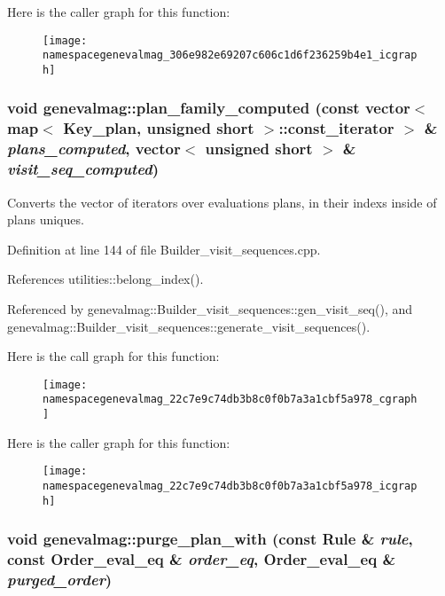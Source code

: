 Here is the caller graph for this function:\nopagebreak
\begin{figure}[H]
\begin{center}
\leavevmode
\texttt{[image: namespacegenevalmag\_306e982e69207c606c1d6f236259b4e1\_icgraph]}
\end{center}
\end{figure}
\hypertarget{namespacegenevalmag_22c7e9c74db3b8c0f0b7a3a1cbf5a978}{
\subsubsection[{plan\_\-family\_\-computed}]{\setlength{\rightskip}{0pt plus 5cm}void genevalmag::plan\_\-family\_\-computed (const vector$<$ map$<$ {\bf Key\_\-plan}, unsigned short $>$::const\_\-iterator $>$ \& {\em plans\_\-computed}, \/  vector$<$ unsigned short $>$ \& {\em visit\_\-seq\_\-computed})}}
\label{namespacegenevalmag_22c7e9c74db3b8c0f0b7a3a1cbf5a978}


Converts the vector of iterators over evaluations plans, in their indexs inside of plans uniques. 

Definition at line 144 of file Builder\_\-visit\_\-sequences.cpp.

References utilities::belong\_\-index().

Referenced by genevalmag::Builder\_\-visit\_\-sequences::gen\_\-visit\_\-seq(), and genevalmag::Builder\_\-visit\_\-sequences::generate\_\-visit\_\-sequences().

Here is the call graph for this function:\nopagebreak
\begin{figure}[H]
\begin{center}
\leavevmode
\texttt{[image: namespacegenevalmag\_22c7e9c74db3b8c0f0b7a3a1cbf5a978\_cgraph]}
\end{center}
\end{figure}


Here is the caller graph for this function:\nopagebreak
\begin{figure}[H]
\begin{center}
\leavevmode
\texttt{[image: namespacegenevalmag\_22c7e9c74db3b8c0f0b7a3a1cbf5a978\_icgraph]}
\end{center}
\end{figure}
\hypertarget{namespacegenevalmag_ce0b7e67565040ba64e1710d0029026b}{
\subsubsection[{purge\_\-plan\_\-with}]{\setlength{\rightskip}{0pt plus 5cm}void genevalmag::purge\_\-plan\_\-with (const {\bf Rule} \& {\em rule}, \/  const Order\_\-eval\_\-eq \& {\em order\_\-eq}, \/  Order\_\-eval\_\-eq \& {\em purged\_\-order})}}
\label{namespacegenevalmag_ce0b7e67565040ba64e1710d0029026b}


